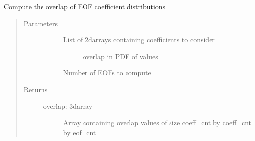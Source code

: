 \documentclass[letterpaper,10pt,english]{sphinxmanual}
\begin{document}
\begin{fulllineitems}
\label{\detokenize{stochprop.eofs:stochprop.eofs.compute_overlap}}
Compute the overlap of EOF coefficient distributions
\begin{quote}\begin{description}
\item[{Parameters}] \leavevmode\begin{description}
\item[{}] \leavevmode\begin{description}
\item[{List of 2darrays containing coefficients to consider}] \leavevmode
overlap in PDF of values

\end{description}

\item[{}] \leavevmode
Number of EOFs to compute

\end{description}

\item[{Returns}] \leavevmode\begin{description}
\item[{overlap: 3darray}] \leavevmode
Array containing overlap values of size coeff\_cnt by coeff\_cnt by eof\_cnt

\end{description}

\end{description}\end{quote}

\end{fulllineitems}

\end{document}
